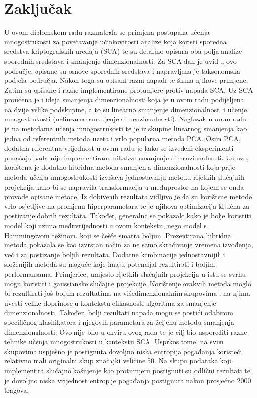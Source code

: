 \documentclass[times, utf8, diplomski]{fer}
\begin{document}
\chapter{Zaključak}
U ovom diplomskom radu razmatrala se primjena postupaka učenja mnogostrukosti za povećavanje učinkovitosti analize koja koristi sporedna sredstva kriptografskih uređaja (SCA) te su detaljno opisana oba polja analize sporednih sredstava i smanjenje dimenzionalnosti. Za SCA dan je uvid u ovo područje, opisane su osnove sporednih sredstava i napravljena je taksonomska podjela područja. Nakon toga su opisani razni napadi te širina njihove primjene. Zatim su opisane i razne implementirane protumjere protiv napada SCA. Uz SCA proučena je i ideja smanjenja dimenzionalnosti koja je u ovom radu podijeljena na dvije velike podskupine, a to su linearno smanjenje dimenzionalnosti i učenje mnogostrukosti (nelinearno smanjenje dimenzionalnosti). Naglasak u ovom radu je na metodama učenja mnogostrukosti te je iz skupine linearnog smanjenja kao jedna od referentnih metoda uzeta i vrlo popularna metoda PCA. Osim PCA, dodatna referentna vrijednost u ovom radu je kako se izvedeni eksperimenti ponašaju kada nije implementirano nikakvo smanjenje dimenzionalnosti. Uz ovo, korištena je dodatno hibridna metoda smanjenja dimenzionalnosti koja prije metoda učenja mnogostrukosti izvršava jednostavniju metodu rijetkih slučajnih projekcija kako bi se napravila transformacija u međuprostor na kojem se onda provode opisane metode. Iz dobivenih rezultata vidljivo je da su korištene metode vrlo osjetljive na promjenu hiperparametara te je njihova optimizacija ključna za postizanje dobrih rezultata. Također, generalno se pokazalo kako je bolje koristiti model koji uzima međuvrijednosti u ovom kontekstu, nego model s Hammingovom težinom, koji se češće smatra boljim. Prezentirana hibridna metoda pokazala se kao izvrstan način za ne samo skraćivanje vremena izvođenja, već i za postizanje boljih rezultata. Dodatne kombinacije jednostavnijih i složenijih metoda su moguće koje imaju potencijal rezultirati i boljim performansama. Primjerice, umjesto rijetkih slučajnih projekcija u istu se svrhu mogu koristiti i gaussianske slučajne projekcije. Korištenje ovakvih metoda moglo bi rezultirati još boljim rezultatima na višedimenzionalnim skupovima i na njima uvesti velike doprinose u kontekstu efikasnosti algoritma za smanjenje dimenzionalnosti. Također, bolji rezultati napada mogu se postići odabirom specifičnog klasifikatora i njegovih parametara za željenu metodu smanjenja dimenzionalnosti. Ovo nije bilo u okviru ovog rada te je cilj bio usporediti razne tehnike učenja mnogostrukosti u kontekstu SCA. Usprkos tome, na svim skupovima uspješno je postignuta dovoljno niska entropija pogađanja koristeći relativno mali originalni skup značajki veličine 50. Na skupu podataka koji implementira slučajno kašnjenje kao protumjeru postignuti su odlični rezultati te je dovoljno niska vrijednost entropije pogađanja postignuta nakon prosječno 2000 tragova.
\end{document}

